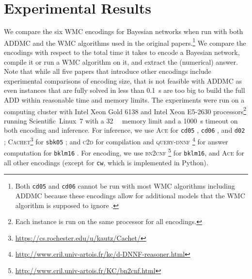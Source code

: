 \section{Experimental Results}\label{sec:2experiments}

We compare the six WMC encodings for Bayesian networks when run with both
\textsc{ADDMC} \citep{DBLP:conf/aaai/DudekPV20} and the WMC algorithms used in
the original papers.\footnote{Both \texttt{cd05} and \texttt{cd06} cannot be run
  with most WMC algorithms including \textsc{ADDMC} because these encodings
  allow for additional models that the WMC algorithm is supposed to ignore
  \citep{DBLP:conf/ijcai/ChaviraD05,DBLP:conf/sat/ChaviraD06}.} We compare the
encodings with respect to the total time it takes to encode a Bayesian network,
compile it or run a WMC algorithm on it, and extract the (numerical) answer.
Note that while all five papers that introduce other encodings include
experimental comparisons of encoding size, that is not feasible with
\textsc{ADDMC} as even instances that are fully solved in less than
\SI{0.1}{\second} are too big to build the full ADD within reasonable time and
memory limits. The experiments were run on a computing cluster with Intel Xeon
Gold 6138 and Intel Xeon E5-2630 processors\footnote{Each instance is run on the
  same processor for all encodings.} running Scientific~Linux~7 with a
\SI{32}{\gibi\byte} memory limit and a \SI{1000}{\second} timeout on both
encoding and inference. For inference, we use \textsc{Ace} for \texttt{cd05}
\citep{DBLP:conf/ijcai/ChaviraD05}, \texttt{cd06}
\citep{DBLP:conf/sat/ChaviraD06}, and \texttt{d02}
\citep{DBLP:conf/kr/Darwiche02};
\textsc{Cachet}\footnote{\url{https://cs.rochester.edu/u/kautz/Cachet/}}
\citep{DBLP:conf/sat/SangBBKP04} for \texttt{sbk05}
\citep{DBLP:conf/aaai/SangBK05}; and \textsc{c2d}
\citep{DBLP:conf/ecai/Darwiche04} for compilation and \textsc{query-dnnf}
\footnote{\url{http://www.cril.univ-artois.fr/kc/d-DNNF-reasoner.html}} for
answer computation for \texttt{bklm16} \citep{DBLP:conf/ecai/BartKLM16}. For
encoding, we use \textsc{bn2cnf}
\footnote{\url{http://www.cril.univ-artois.fr/KC/bn2cnf.html}} for
\texttt{bklm16}, and \textsc{Ace} for all other encodings (except for
\texttt{cw}, which is implemented in Python).

